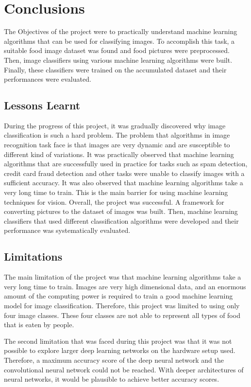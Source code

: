 \chapter{Conclusions}



The Objectives of the project were to practically understand machine learning algorithms that can be used for classifying images. To accomplish this task,  a suitable food image dataset was found and food pictures were preprocessed. Then, image classifiers using various machine learning algorithms were built.  Finally, these classifiers were trained on the accumulated dataset and their performances were evaluated.

\section{Lessons Learnt}

During the progress of this project, it was gradually discovered why image classification is such a hard problem.  The problem that algorithms in image recognition task face is that images are very dynamic and are susceptible to different kind of variations. It was practically observed that machine learning algorithms that are successfully used in practice for tasks such as spam detection, credit card fraud detection and other tasks were unable to classify images with a sufficient accuracy.  It was also observed that machine learning algorithms take a very long time to train. This is the main barrier for using machine learning techniques for vision. Overall, the project was successful. A framework for converting pictures to the dataset of images was built. Then,  machine learning classifiers that used different classification algorithms were developed and their performance was systematically evaluated.

\section{Limitations}
The main limitation of the project was that machine learning algorithms take a very long time to train. Images are very high dimensional data, and an enormous amount of the computing power is required to train a good machine learning model for image classification. Therefore, this project was limited to using only four image classes. These four classes are not able to represent all types of food that is eaten by people.

The second limitation that was faced during this project was that it was not possible to explore larger deep learning networks on the hardware setup used. Therefore, a maximum accuracy score of the deep neural network and the convolutional neural network could not be reached. With deeper architectures of neural networks, it would be plausible to achieve better accuracy scores.

